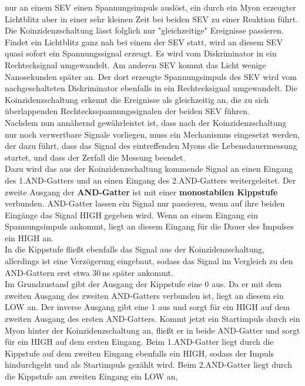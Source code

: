     nur an einem SEV einen Spannungsimpuls auslöst, ein durch ein Myon erzeugter
    Lichtblitz aber in einer sehr kleinen Zeit bei beiden SEV zu einer Reaktion
    führt. Die Koinzidenzschaltung lässt folglich nur
    "gleichzeitige" Ereignisse passieren.
    Findet ein Lichtblitz ganz nah bei einem der SEV statt, wird an
    diesem SEV quasi sofort ein Spannungssignal erzeugt. Es wird
    vom Diskriminator in ein Rechtecksignal umgewandelt.
    Am anderen SEV kommt das Licht wenige Nanosekunden später an.
    Der dort erzeugte Spannungsimpuls des SEV wird vom nachgeschalteten
    Diskriminator ebenfalls in ein Rechtecksignal umgewandelt.
    Die Koinzidenzschaltung erkennt die Ereignisse
    als gleichzeitig an, die zu sich überlappenden Rechtecksspannungssignalen
    der beiden SEV führen.\\
    Nachdem nun annähernd gewährleistet ist, dass nach der Koinzidenzschaltung
    nur noch verwertbare Signale vorliegen, muss ein Mechanismus eingesetzt
    werden, der dazu führt, dass das Signal des eintreffenden Myons die
    Lebensdauermessung startet, und dass der Zerfall die Messung beendet. \\
    Dazu wird das aus der Koinzidenzschaltung kommende Signal an einen Eingang
    des 1.AND-Gatters und an einen Eingang des 2.AND-Gatters weitergeleitet.
    Der zweite Ausgang der \textbf{AND-Gatter} ist mit einer
    \textbf{monostabilen
    Kippstufe} verbunden.
    AND-Gatter lassen ein Signal nur passieren, wenn auf ihre beiden
    Eingänge das Signal HIGH gegeben wird. Wenn an einem Eingang ein
    Spannungsimpuls ankommt, liegt an diesem Eingang für die Dauer
    des Impulses ein HIGH an.\\
    In die Kippstufe fließt ebenfalls das Signal aus der Koinzidenzschaltung, allerdings
    ist eine Verzögerung eingebaut, sodass das Signal im Vergleich zu den AND-Gattern
    erst etwa 30\,ns später ankommt.\\
    Im Grundzustand gibt der Ausgang der Kippstufe eine 0 aus. Da er mit dem
    zweiten Ausgang des zweiten AND-Gatters verbunden ist, liegt an diesem
    ein LOW an. Der inverse Ausgang gibt eine 1 aus und sorgt für
    ein HIGH auf dem zweiten Ausgang des ersten AND-Gatters.
    Kommt jetzt ein Startimpuls durch ein Myon hinter der Koinzidenzschaltung
    an, fließt er in beide AND-Gatter und sorgt für ein HIGH auf dem ersten
    Eingang. Beim 1.AND-Gatter liegt durch die Kippstufe auf dem zweiten
    Eingang ebenfalls ein HIGH, sodass der Impuls hindurchgeht und
    als Startimpuls gezählt wird.
    Beim 2.AND-Gatter liegt durch die Kippstufe am zweiten Eingang ein LOW an,
